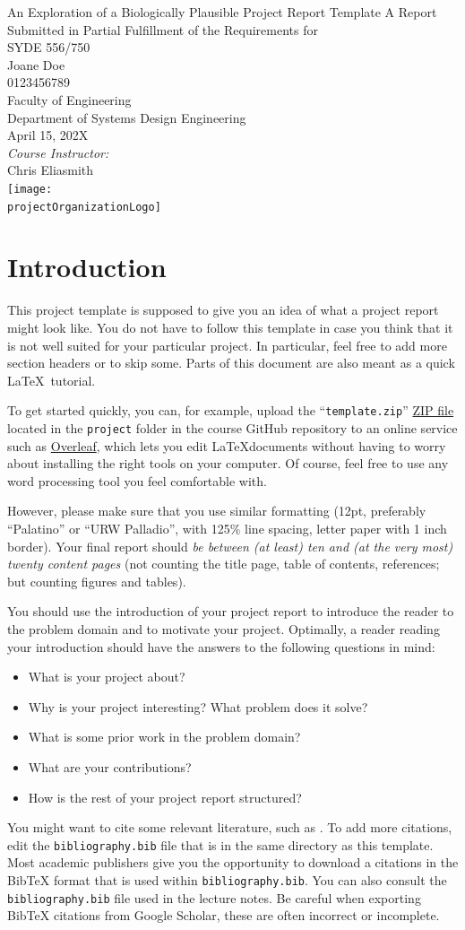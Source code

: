 \documentclass[12pt,letterpaper,oneside]{article}
\newcommand{\MakeTitle}{%
	{%
		\thispagestyle{empty}
		\centering
		{\huge \projectName}
		\vfill
		{\large A Report Submitted in Partial Fulfillment of the Requirements for\\ \projectCourse}\\[1cm]
		{\large \projectStudentName}\\
		{\projectStudentID} \\[1cm]
		{\large \projectStudentFaculty}\\
		{\large \projectStudentDepartment}\\
		\vfill
		{\large \projectDate}\\[1cm]
		\emph{Course Instructor:}\\
		\projectCourseInstructor\\
		\vfill
		\texttt{[image: \\projectOrganizationLogo]}
		\setcounter{page}{0}
		\newpage%
	}%
	{%
		\pagenumbering{roman}
		\setcounter{tocdepth}{2}
		\tableofcontents
		\newpage
		
		\setcounter{page}{0}
		\pagenumbering{arabic}
	}
}
\newcommand{\projectCourse}%
	{SYDE 556/750}
\newcommand{\projectCourseInstructor}%
	{Chris Eliasmith}
\newcommand{\projectOrganizationLogo}%
	{assets/uwlogo.pdf}
\newcommand{\projectName}%
	{An Exploration of a Biologically Plausible Project Report Template}
\newcommand{\projectStudentName}%
	{Joane Doe}
\newcommand{\projectStudentID}%
	{0123456789}
\newcommand{\projectStudentFaculty}%
	{Faculty of Engineering}
\newcommand{\projectStudentDepartment}%
	{Department of Systems Design Engineering}
\newcommand{\projectDate}%
	{April 15, 202X}
\begin{document}
	\MakeTitle

	\section{Introduction}
	\label{sec:introduction}

	This project template is supposed to give you an idea of what a project report might look like. You do not have to follow this template in case you think that it is not well suited for your particular project. In particular, feel free to add more section headers or to skip some. Parts of this document are also meant as a quick \LaTeX\ tutorial.

	To get started quickly, you can, for example, upload the \enquote{\texttt{template.zip}} \href{https://github.com/astoeckel/syde556-w20/raw/master/project/template.zip}{ZIP file} located in the \texttt{project} folder in the course GitHub repository to an online service such as \href{https://www.overleaf.com/}{Overleaf}, which lets you edit \LaTeX documents without having to worry about installing the right tools on your computer. Of course, feel free to use any word processing tool you feel comfortable with.

	However, please make sure that you use similar formatting (12pt, preferably \enquote{Palatino} or \enquote{URW Palladio}, with 125\% line spacing, letter paper with 1 inch border). Your final report should \emph{be between (at least) ten and (at the very most) twenty content pages} (not counting the title page, table of contents, references; but counting figures and tables).

	You should use the introduction of your project report to introduce the reader to the problem domain and to motivate your project. Optimally, a reader reading your introduction should have the answers to the following questions in mind:
	\begin{itemize}
		\item What is your project about?
		\item Why is your project interesting? What problem does it solve?
		\item What is some prior work in the problem domain?
		\item What are your contributions?
		\item How is the rest of your project report structured?
	\end{itemize}

 	You might want to cite some relevant literature, such as \cite{eliasmith2003neural,eliasmith2013how}. To add more citations, edit the \texttt{bibliography.bib} file that is in the same directory as this template. Most academic publishers give you the opportunity to download a citations in the BibTeX format that is used within \texttt{bibliography.bib}. You can also consult the \texttt{bibliography.bib} file used in the lecture notes. Be careful when exporting BibTeX citations from Google Scholar, these are often incorrect or incomplete.
 	
\end{document}
